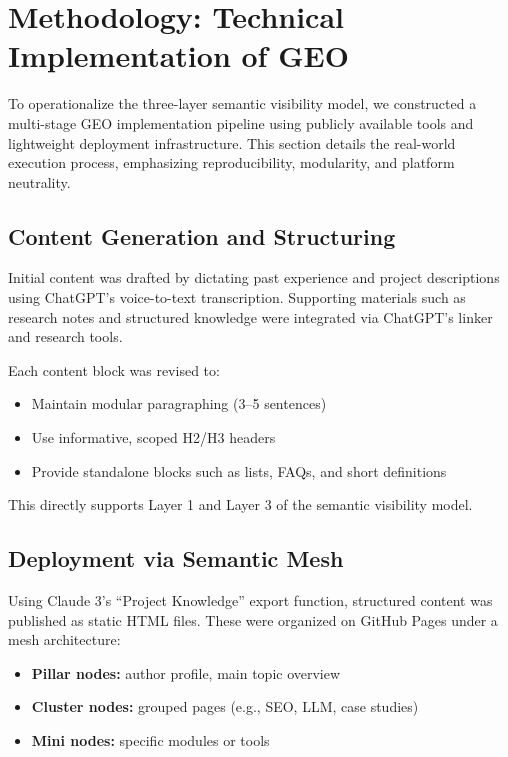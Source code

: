 \section{Methodology: Technical Implementation of GEO}

To operationalize the three-layer semantic visibility model, we constructed a multi-stage GEO implementation pipeline using publicly available tools and lightweight deployment infrastructure. This section details the real-world execution process, emphasizing reproducibility, modularity, and platform neutrality.

\subsection{Content Generation and Structuring}

Initial content was drafted by dictating past experience and project descriptions using ChatGPT’s voice-to-text transcription. Supporting materials such as research notes and structured knowledge were integrated via ChatGPT’s linker and research tools.

Each content block was revised to:
\begin{itemize}
  \item Maintain modular paragraphing (3--5 sentences)
  \item Use informative, scoped H2/H3 headers
  \item Provide standalone blocks such as lists, FAQs, and short definitions
\end{itemize}

This directly supports Layer 1 and Layer 3 of the semantic visibility model.

\subsection{Deployment via Semantic Mesh}

Using Claude 3’s “Project Knowledge” export function, structured content was published as static HTML files. These were organized on GitHub Pages under a mesh architecture:
\begin{itemize}
  \item \textbf{Pillar nodes:} author profile, main topic overview
  \item \textbf{Cluster nodes:} grouped pages (e.g., SEO, LLM, case studies)
  \item \textbf{Mini nodes:} specific modules or tools
\end{itemize}

